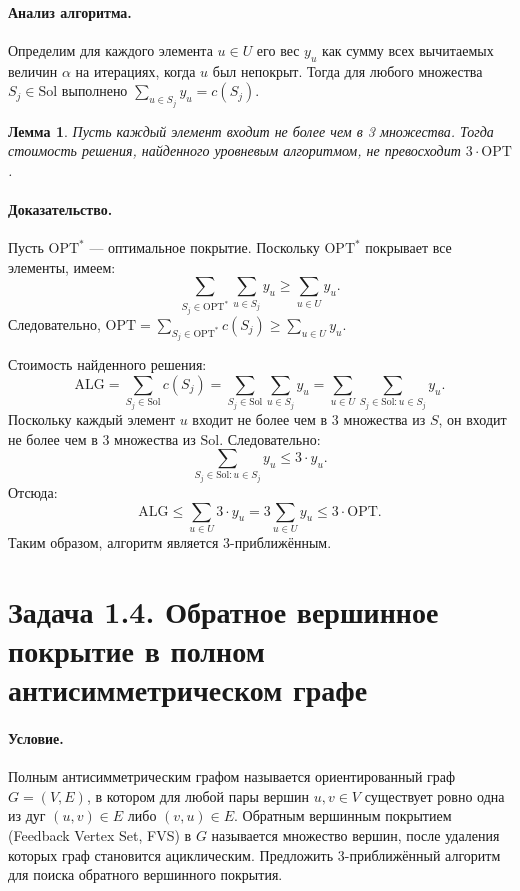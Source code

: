 \documentclass[12pt]{article}
\newtheorem{lemma}{Лемма}
\begin{document}
  \paragraph{Анализ алгоритма.}
  Определим для каждого элемента \(u \in U\) его вес \(y_u\) как сумму всех вычитаемых величин \(\alpha\) на итерациях, когда \(u\) был непокрыт. Тогда для любого множества \(S_j \in \text{Sol}\) выполнено \(\sum_{u \in S_j} y_u = c(S_j)\).

  \begin{lemma}
  Пусть каждый элемент входит не более чем в 3 множества. Тогда стоимость решения, найденного уровневым алгоритмом, не превосходит \(3 \cdot \text{OPT}\).
  \end{lemma}

  \paragraph{Доказательство.}
  Пусть \(\text{OPT}^*\) — оптимальное покрытие. Поскольку \(\text{OPT}^*\) покрывает все элементы, имеем:
  \[
  \sum_{S_j \in \text{OPT}^*} \sum_{u \in S_j} y_u \geq \sum_{u \in U} y_u.
  \]
  Следовательно, \(\text{OPT} = \sum_{S_j \in \text{OPT}^*} c(S_j) \geq \sum_{u \in U} y_u\).

  Стоимость найденного решения:
  \[
  \text{ALG} = \sum_{S_j \in \text{Sol}} c(S_j) = \sum_{S_j \in \text{Sol}} \sum_{u \in S_j} y_u = \sum_{u \in U} \sum_{S_j \in \text{Sol}: u \in S_j} y_u.
  \]
  Поскольку каждый элемент \(u\) входит не более чем в 3 множества из \(S\), он входит не более чем в 3 множества из \(\text{Sol}\). Следовательно:
  \[
  \sum_{S_j \in \text{Sol}: u \in S_j} y_u \leq 3 \cdot y_u.
  \]
  Отсюда:
  \[
  \text{ALG} \leq \sum_{u \in U} 3 \cdot y_u = 3 \sum_{u \in U} y_u \leq 3 \cdot \text{OPT}.
  \]
  Таким образом, алгоритм является 3-приближённым.

  \section*{Задача 1.4. Обратное вершинное покрытие в полном антисимметрическом графе}

  \paragraph{Условие.}
  Полным антисимметрическим графом называется ориентированный граф \(G = (V, E)\), в котором для любой пары вершин \(u, v \in V\) существует ровно одна из дуг \((u, v) \in E\) либо \((v, u) \in E\). Обратным вершинным покрытием (Feedback Vertex Set, FVS) в \(G\) называется множество вершин, после удаления которых граф становится ациклическим. Предложить 3-приближённый алгоритм для поиска обратного вершинного покрытия.
\end{document}
